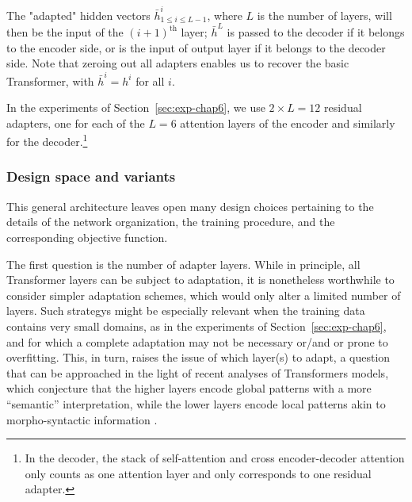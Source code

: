 The "adapted" hidden vectors $\bar{h}^i_{ 1\leq i \leq L-1}$, where $L$ is the number of layers, will then be the input of the $(i+1)^{\text{th}}$ layer; $\bar{h}^L$ is passed to the decoder if it belongs to the encoder side, or is the input of output layer if it belongs to the decoder side. Note that zeroing out all adapters enables us to recover the basic Transformer, with $\bar{h}^{i} = h^i$ for all $i$.

In the experiments of Section~\ref{sec:exp-chap6}, we use $2\times{}L=12$ residual adapters, one for each of the $L=6$ attention layers of the encoder and similarly for the decoder.\footnote{In the decoder, the stack of self-attention and cross encoder-decoder attention only counts as one attention layer and only corresponds to one residual adapter.}

\subsubsection{Design space and variants}
\label{sssec:design-space-chap6}
This general architecture leaves open many design choices pertaining to the details of the network organization, the training procedure, and the corresponding objective function.

The first question is the number of adapter layers. While in principle, all Transformer layers can be subject to adaptation, it is nonetheless worthwhile to consider simpler adaptation schemes, which would only alter a limited number of layers. Such strategys might be especially relevant when the training data contains very small domains, as in the experiments of Section~\ref{sec:exp-chap6}, and for which a complete adaptation may not be necessary or/and or prone to overfitting. This, in turn, raises the issue of which layer(s) to adapt, a question that can be approached in the light of recent analyses of Transformers models, which conjecture that the higher layers encode global patterns with a more ``semantic'' interpretation, while the lower layers encode local patterns akin to morpho-syntactic information \cite{raganato18analysis}.


